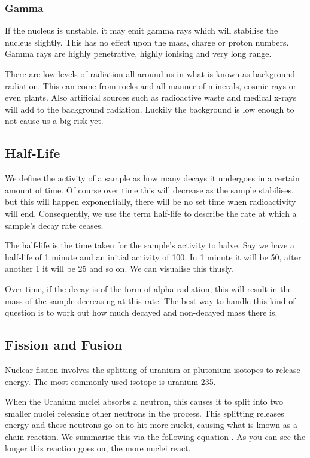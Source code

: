 \documentclass[11pt, titlepage]{article}
\begin{document}
\subsubsection*{Gamma}
If the nucleus is unstable, it may emit gamma rays which will stabilise the nucleus slightly.  This has no effect upon the mass, charge or proton numbers.
Gamma rays are highly penetrative, highly ionising and very long range.


There are low levels of radiation all around us in what is known as background radiation.  This can come from rocks and all manner of minerals, cosmic rays or even plants.  Also artificial sources such as radioactive waste and medical x-rays will add to the background radiation.  Luckily the background is low enough to not cause us a big risk yet.



\subsection{Half-Life}
We define the activity of a sample as how many decays it undergoes in a certain amount of time.  Of course over time this will decrease as the sample stabilises, but this will happen exponentially, there will be no set time when radioactivity will end.  Consequently, we use the term half-life to describe the rate at which a sample's decay rate ceases.  

The half-life is the time taken for the sample's activity to halve.  Say we have a half-life of 1 minute and an initial activity of 100.  In 1 minute it will be 50, after another 1 it will be 25 and so on.  We can visualise this thusly.
  
\begin{figure}[H]
\centering

\end{figure}

Over time, if the decay is of the form of alpha radiation, this will result in the mass of the sample decreasing at this rate.  The best way to handle this kind of question is to work out how much decayed and non-decayed mass there is.

\subsection{Fission and Fusion}
Nuclear fission involves the splitting of uranium or plutonium isotopes to release energy.  The most commonly used isotope is uranium-235.

When the Uranium nuclei absorbs a neutron, this causes it to split into two smaller nuclei releasing other neutrons in the process.  This splitting releases energy and these neutrons go on to hit more nuclei, causing what is known as a chain reaction.  We summarise this via the following equation
.  As you can see the longer this reaction goes on, the more nuclei react.
\end{document}
